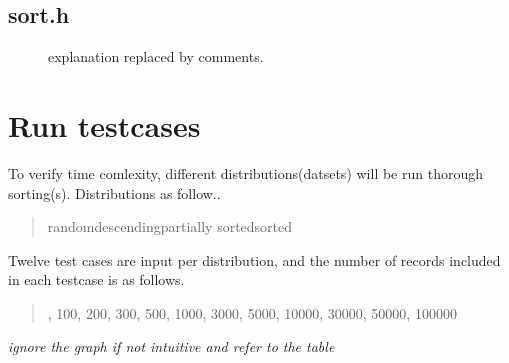 \documentclass{article}
\begin{document}
\subsection{sort.h}

\begin{figure}[H]
\caption*{explanation replaced by comments.}
\end{figure}

\pagebreak
\section{Run testcases}
To verify time comlexity,
different distributions(datsets) will be run thorough sorting(s).
Distributions as follow..
\begin{quote}\centering
    random\;\;\;\;descending\;\;\;\;partially sorted\;\;\;\;sorted
\end{quote}

Twelve test cases are input per distribution, and the number of records included in each testcase is as follows.
\begin{quote}, 100, 200, 300, 500, 1000, 3000, 5000, 10000, 30000, 50000, 100000
\end{quote}
\textit{ignore the graph if not intuitive and refer to the table}

\end{document}
